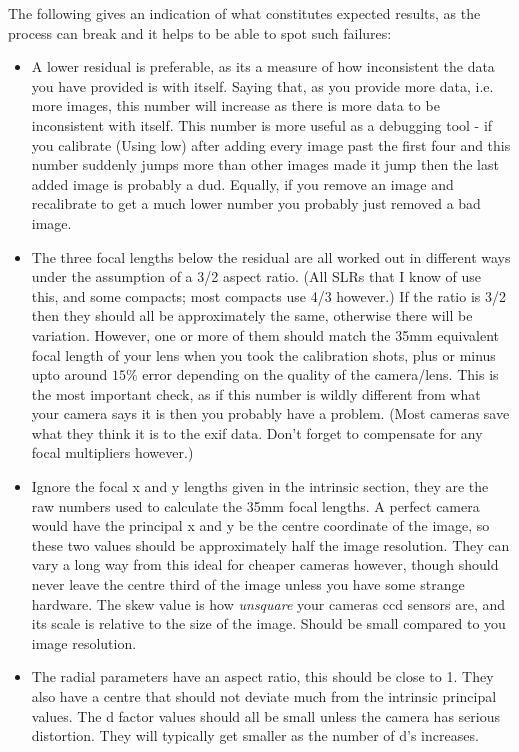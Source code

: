 \documentclass[10pt,a4paper,twoside]{article}
\begin{document}
The following gives an indication of what constitutes expected results, as the process can break and it helps to be able to spot such failures:
\begin{itemize}
\item A lower residual is preferable, as its a measure of how inconsistent the data you have provided is with itself. Saying that, as you provide more data, i.e. more images, this number will increase as there is more data to be inconsistent with itself. This number is more useful as a debugging tool - if you calibrate (Using low) after adding every image past the first four and this number suddenly jumps more than other images made it jump then the last added image is probably a dud. Equally, if you remove an image and recalibrate to get a much lower number you probably just removed a bad image.
\item The three focal lengths below the residual are all worked out in different ways under the assumption of a 3/2 aspect ratio. (All SLRs that I know of use this, and some compacts; most compacts use 4/3 however.) If the ratio is 3/2 then they should all be approximately the same, otherwise there will be variation. However, one or more of them should match the 35mm equivalent focal length of your lens when you took the calibration shots, plus or minus upto around $15\%$ error depending on the quality of the camera/lens. This is the most important check, as if this number is wildly different from what your camera says it is then you probably have a problem. (Most cameras save what they think it is to the exif data. Don't forget to compensate for any focal multipliers however.)
\item Ignore the focal x and y lengths given in the intrinsic section, they are the raw numbers used to calculate the 35mm focal lengths. A perfect camera would have the principal x and y be the centre coordinate of the image, so these two values should be approximately half the image resolution. They can vary a long way from this ideal for cheaper cameras however, though should never leave the centre third of the image unless you have some strange hardware. The skew value is how \emph{unsquare} your cameras ccd sensors are, and its scale is relative to the size of the image. Should be small compared to you image resolution.
\item The radial parameters have an aspect ratio, this should be close to 1. They also have a centre that should not deviate much from the intrinsic principal values. The d factor values should all be small unless the camera has serious distortion. They will typically get smaller as the number of d's increases.
\end{itemize}
\end{document}
